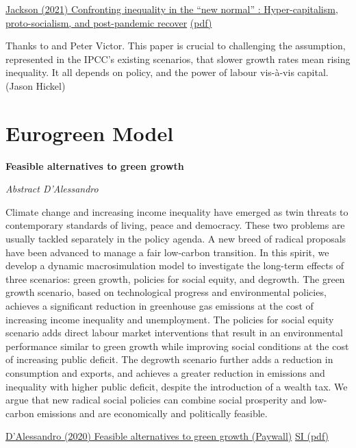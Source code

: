 \documentclass[
]{book}
\begin{document}
\href{https://onlinelibrary.wiley.com/doi/epdf/10.1002/sd.2196}{Jackson (2021) Confronting inequality in the ``new normal'' : Hyper-capitalism,
proto-socialism, and post-pandemic recover}
\href{pdf/Jackson_2021_New_Normal_Model.pdf}{(pdf)}

Thanks to \citet{ProfTimJackson}
and Peter Victor. This paper is crucial to challenging the assumption, represented in the IPCC's existing scenarios, that slower growth rates mean rising inequality. It all depends on policy, and the power of labour vis-à-vis capital.
(Jason Hickel)

\hypertarget{eurogreen-model}{%
\section{Eurogreen Model}\label{eurogreen-model}}

\textbf{Feasible alternatives to green growth}

\emph{Abstract D'Alessandro}

Climate change and increasing income inequality have emerged as twin threats to contemporary standards of living, peace and democracy. These two problems are usually tackled separately in the policy agenda. A new breed of radical proposals have been advanced to manage a fair low-carbon transition. In this spirit, we develop a dynamic macrosimulation model to investigate the long-term effects of three scenarios: green growth, policies for social equity, and degrowth. The green growth scenario, based on technological progress and environmental policies, achieves a significant reduction in greenhouse gas emissions at the cost of increasing income inequality and unemployment. The policies for social equity scenario adds direct labour market interventions that result in an environmental performance similar to green growth while improving social conditions at the cost of increasing public deficit. The degrowth scenario further adds a reduction in consumption and exports, and achieves a greater reduction in emissions and inequality with higher public deficit, despite the introduction of a wealth tax. We argue that new radical social policies can combine social prosperity and low-carbon emissions and are economically and politically feasible.

\href{https://www.nature.com/articles/s41893-020-0484-y\#:~:text=A\%20combination\%20of\%20market\%2Dincentive,mitigating\%20its\%20environmental\%20impact2}{D'Alessandro (2020) Feasible alternatives to green growth (Paywall)}
\href{pdf/Feasible_Alternatives_SI.pdf}{SI (pdf)}
\end{document}
